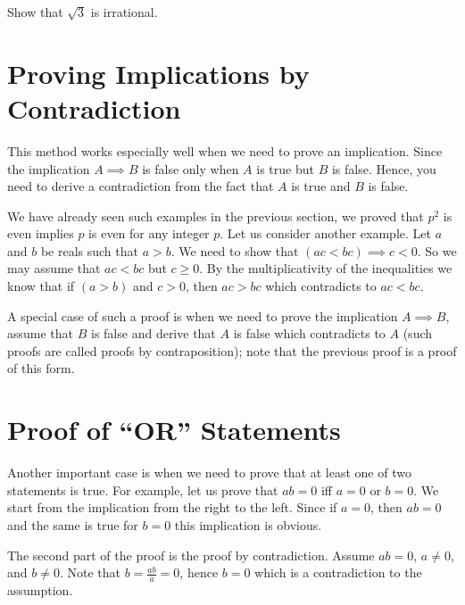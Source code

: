 \begin{exercise}
  Show that $\sqrt{3}$ is irrational.
\end{exercise}

\section{Proving Implications by Contradiction}
This method works especially well when we need to prove an implication.
Since the implication $A \implies B$ is false only when $A$ is true but $B$ is
false. Hence, you need to derive a contradiction from the fact that $A$ is true
and $B$ is false.

We have already seen such examples in the previous section, we proved that
$p^2$ is even implies $p$ is even for any integer $p$. Let us consider another
example. Let $a$ and $b$ be reals such that $a > b$. We need to show that
$(ac < bc) \implies c < 0$. So we may assume that $ac < bc$ but $c \ge 0$. By
the multiplicativity of the inequalities we know that if $(a > b)$ and $c > 0$,
then $ac > bc$ which contradicts to $ac < bc$.

A special case of such a proof is when we need to prove the implication
$A \implies B$, assume that $B$ is false and derive that $A$ is false which
contradicts to  $A$ (such proofs are called proofs by contraposition); note
that the previous proof is a proof of this form.

\section{Proof of ``OR'' Statements}
Another important case is when we need to prove that at least one of two
statements is true. For example, let us prove that $ab = 0$ iff $a = 0$ or
$b = 0$. We start from the implication from the right to the left. Since if
$a = 0$, then $ab = 0$ and the same is true for $b = 0$ this implication is
obvious.

The second part of the proof is the proof by contradiction. Assume $ab = 0$,
$a \neq 0$, and $b \neq 0$. Note that $b = \frac{ab}{a} = 0$,
hence $b = 0$ which is a contradiction to the assumption.


